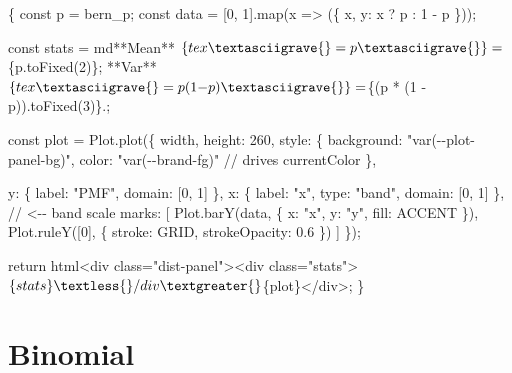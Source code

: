 \documentclass[
  letterpaper,
  DIV=11,
  numbers=noendperiod]{scrreprt}
\newenvironment{Shaded}{\begin{snugshade}}{\end{snugshade}}
\newcommand{\NormalTok}[1]{\textcolor[rgb]{0.00,0.23,0.31}{#1}}
\theoremstyle{definition}
\theoremstyle{plain}
\theoremstyle{definition}
\theoremstyle{remark}
\begin{document}
\begin{Shaded}
\begin{Highlighting}[]

\NormalTok{\{}
\NormalTok{  const p = bern\_p;}
\NormalTok{  const data = [0, 1].map(x =\textgreater{} (\{ x, y: x ? p : 1 {-} p \}));}

\NormalTok{  const stats = md\textasciigrave{}**Mean** $\{tex\textasciigrave{}= p\textasciigrave{}\} = $\{p.toFixed(2)\}; }
\NormalTok{  **Var** $\{tex\textasciigrave{}= p(1{-}p)\textasciigrave{}\} = $\{(p * (1 {-} p)).toFixed(3)\}.\textasciigrave{};}

\NormalTok{  const plot = Plot.plot(\{}
\NormalTok{        width, height: 260,}
\NormalTok{    style: \{}
\NormalTok{    background: "var({-}{-}plot{-}panel{-}bg)",}
\NormalTok{    color: "var({-}{-}brand{-}fg)"           // drives \textquotesingle{}currentColor\textquotesingle{}}
\NormalTok{    \},}

\NormalTok{    y: \{ label: "PMF", domain: [0, 1] \},}
\NormalTok{    x: \{ label: "x", type: "band", domain: [0, 1] \},  // \textless{}{-}{-} band scale}
\NormalTok{    marks: [}
\NormalTok{      Plot.barY(data, \{ x: "x", y: "y", fill: ACCENT \}),}
\NormalTok{      Plot.ruleY([0], \{ stroke: GRID, strokeOpacity: 0.6 \})}
\NormalTok{    ]}
\NormalTok{  \});}

\NormalTok{  return html\textasciigrave{}\textless{}div class="dist{-}panel"\textgreater{}\textless{}div class="stats"\textgreater{}$\{stats\}\textless{}/div\textgreater{}$\{plot\}\textless{}/div\textgreater{}\textasciigrave{};}
\NormalTok{\}}
\end{Highlighting}
\end{Shaded}

\begin{Shaded}
\end{Shaded}

\section{Binomial}
\end{document}
